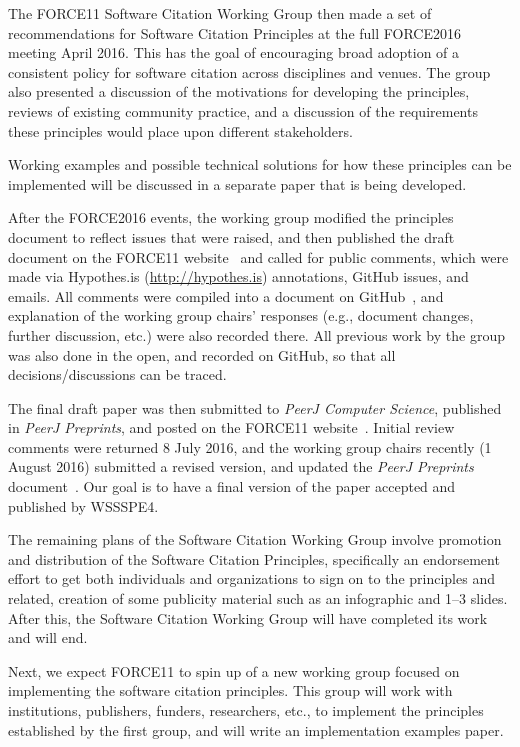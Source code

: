 \documentclass[conference]{IEEEtran}
\begin{document}
The FORCE11 Software Citation Working Group then made a set of recommendations for Software Citation Principles at the full FORCE2016 meeting April 2016. This has the goal of encouraging broad adoption of a consistent policy for software citation across disciplines and venues. The group also presented a discussion of the motivations for developing the principles, reviews of existing community practice, and a discussion of the requirements these principles would place upon different stakeholders.

Working examples and possible technical solutions for how these principles can be implemented will be discussed in a separate paper that is being developed.

After the FORCE2016 events, the working group modified the principles document to reflect issues that were raised, and then published the draft document on the FORCE11 website~\cite{bib2} and called for public comments, which were made via Hypothes.is (\url{http://hypothes.is}) annotations, GitHub issues, and emails. All comments were compiled into a document on GitHub~\cite{bib3}, and explanation of the working group chairs' responses (e.g., document changes, further discussion, etc.) were also recorded there. All previous work by the group was also done in the open, and recorded on GitHub, so that all decisions/discussions can be traced.

The final draft paper was then submitted to \textit{PeerJ Computer Science}, published in \textit{PeerJ Preprints}, and posted on the FORCE11 website~\cite{bib2}. Initial review comments were returned 8 July 2016, and the working group chairs recently (1 August 2016) submitted a revised version, and updated the \textit{PeerJ Preprints} document~\cite{bib4}. Our goal is to have a final version of the paper accepted and published by WSSSPE4.

The remaining plans of the Software Citation Working Group involve promotion and distribution of the Software Citation Principles, specifically an endorsement effort to get both individuals and organizations to sign on to the principles and related, creation of some publicity material such as an infographic and 1--3 slides. After this, the Software Citation Working Group will have completed its work and will end.

Next, we expect FORCE11 to spin up of a new working group focused on implementing the software citation principles. This group will work with institutions, publishers, funders, researchers, etc., to implement the principles established by the first group, and will write an implementation examples paper.
\end{document}
